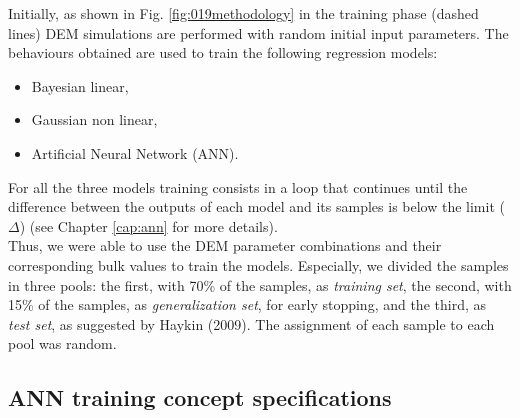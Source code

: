 Initially, as shown in Fig. \ref{fig:019methodology} in the training phase
(dashed lines) \acs{DEM} simulations are performed
with random initial input parameters.
The behaviours obtained are used to train the following regression models:
\begin{itemize}
  \item{Bayesian linear,}
  \item{Gaussian non linear,}
  \item{Artificial Neural Network (\acs{ANN}).}
\end{itemize}
For all the three models training consists in a loop that continues until the
difference between the outputs of each model and its samples is below the
limit ($\Delta$) (see Chapter \ref{cap:ann} for more details).\\
Thus, we were able to use the \acs{DEM} parameter combinations and their
corresponding bulk values to train the models.
Especially, we divided the samples in three pools: the first, with 70\% of the
samples, as \textit{training set}, the second, with 15\% of the samples, as
\textit{generalization set}, for early stopping, and the third, as \textit{test
set}, as suggested by Haykin (2009). The assignment of each sample to each pool
was random.

\subsection{ANN training concept specifications}
\label{subsec:anntrainingconceptspecifications}

